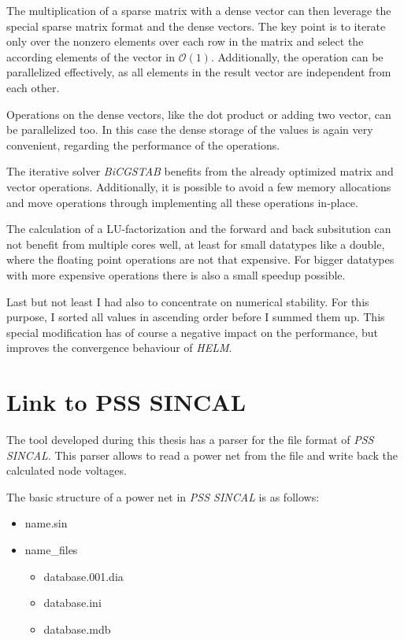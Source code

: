 The multiplication of a sparse matrix with a dense vector can then leverage the special sparse matrix format and the dense vectors. The key point is to iterate only over the nonzero elements over each row in the matrix and select the according elements of the vector in $\mathcal O(1)$. Additionally, the operation can be parallelized effectively, as all elements in the result vector are independent from each other.

Operations on the dense vectors, like the dot product or adding two vector, can be parallelized too. In this case the dense storage of the values is again very convenient, regarding the performance of the operations.

The iterative solver \emph{BiCGSTAB} benefits from the already optimized matrix and vector operations. Additionally, it is possible to avoid a few memory allocations and move operations through implementing all these operations in-place.

The calculation of a LU-factorization and the forward and back subsitution can not benefit from multiple cores well, at least for small datatypes like a double, where the floating point operations are not that expensive. For bigger datatypes with more expensive operations there is also a small speedup possible.

Last but not least I had also to concentrate on numerical stability. For this purpose, I sorted all values in ascending order before I summed them up. This special modification has of course a negative impact on the performance, but improves the convergence behaviour of \emph{HELM}.

\section{Link to PSS SINCAL}
\label{sec:link_sincal}
The tool developed during this thesis has a parser for the file format of \emph{PSS SINCAL}. This parser allows to read a power net from the file and write back the calculated node voltages.

The basic structure of a power net in \emph{PSS SINCAL} is as follows:
\begin{itemize}
	\item {\textlangle}name{\textrangle}.sin
	\item {\textlangle}name{\textrangle\_}files
	\begin{itemize}
		\item database.001.dia
		\item database.ini
		\item database.mdb
	\end{itemize}
\end{itemize}

